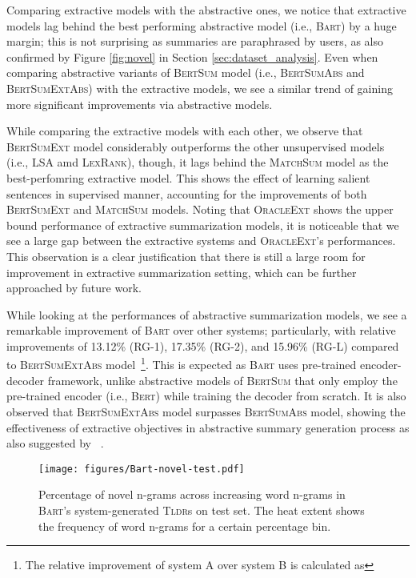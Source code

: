 \documentclass[10pt, a4paper]{article}
\newcommand{\bart}{\textsc{Bart}}
\newcommand{\tldr}{\textsc{Tldr}}
\begin{document}
Comparing extractive models with the abstractive ones, we notice that extractive models lag behind the best performing abstractive model (i.e., \bart) by a huge margin;
this is not surprising as summaries are paraphrased by users, 
as also confirmed by Figure \ref{fig:novel} in Section \ref{sec:dataset_analysis}.  Even when comparing abstractive variants of \textsc{BertSum} model (i.e., \textsc{BertSumAbs} and \textsc{BertSumExtAbs}) with the extractive models, we see a similar trend of gaining more significant improvements via abstractive models. 

While comparing the extractive models with each other, we observe that \textsc{BertSumExt} model considerably outperforms the other unsupervised models (i.e., \textsc{LSA} amd \textsc{LexRank}), though, it lags behind the \textsc{MatchSum} model as the best-perfomring extractive model. This shows the effect of learning salient sentences in supervised manner, accounting for the improvements of both \textsc{BertSumExt} and \textsc{MatchSum} models. Noting that \textsc{OracleExt}
shows the upper bound performance of extractive summarization models, it is noticeable that we see a large gap between the extractive systems and \textsc{OracleExt}'s performances. This observation is a clear justification that there is still a large room for improvement in extractive summarization setting, which can be further approached by future work.

While looking at the performances of abstractive summarization models, we see a remarkable improvement of \bart{} over other systems; particularly, with relative improvements of 13.12\% (RG-1), 17.35\% (RG-2), and 15.96\% (RG-L) compared to \textsc{BertSumExtAbs} model~\footnote{The relative improvement of system A over system B is calculated as }. This is expected as \bart{} uses pre-trained encoder-decoder framework, unlike abstractive models of \textsc{BertSum} that only employ the pre-trained encoder (i.e., \textsc{Bert}) while training the decoder from scratch. It is also observed that \textsc{BertSumExtAbs} model surpasses \textsc{BertSumAbs} model, showing the effectiveness of extractive objectives in abstractive summary generation process as also suggested by ~. 


\begin{figure}
    \centering
    \texttt{[image: figures/Bart-novel-test.pdf]}
    \caption{Percentage of novel n-grams across increasing word n-grams in \bart 's system-generated \tldr s on test set. The heat extent shows the frequency of word n-grams for a certain percentage bin.}
    \label{fig:bart-ngrams}
\end{figure}
\end{document}
